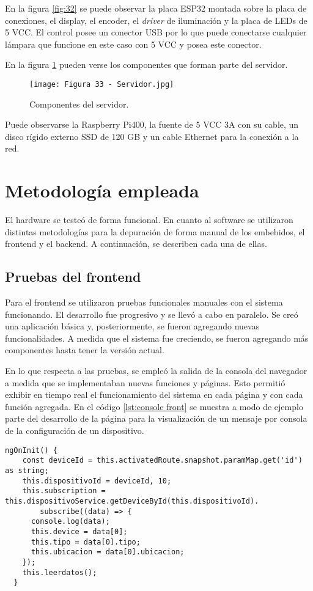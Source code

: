 En la figura  \ref{fig:32} se puede observar la placa ESP32 montada sobre la placa de conexiones, el display, el encoder, el \textit{driver} de iluminación y la placa de LEDs de 5 VCC. El control posee un conector USB por lo que puede conectarse cualquier lámpara que funcione en este caso con 5 VCC y posea este conector.

En la figura \ref{fig:33} pueden verse los componentes que forman parte del servidor.

\begin{figure}[h]
\centering
\texttt{[image: Figura 33 - Servidor.jpg]}
\caption[Servidor]{Componentes del servidor.}
\label{fig:33}
\end{figure}

Puede observarse la Raspberry Pi400, la fuente de 5 VCC 3A con su cable, un disco rígido externo SSD de 120 GB y un cable Ethernet para la conexión a la red.

\section{Metodología empleada}

El hardware se testeó de forma funcional. En cuanto al software se utilizaron distintas metodologías para la depuración de forma manual de los embebidos, el frontend y el backend. A continuación, se describen cada una de ellas.

\subsection{Pruebas del frontend}

Para el frontend se utilizaron pruebas funcionales manuales con el sistema funcionando. El desarrollo fue progresivo y se llevó a cabo en paralelo. Se creó una aplicación básica y, posteriormente, se fueron agregando nuevas funcionalidades. A medida que el sistema fue creciendo, se fueron agregando más componentes hasta tener la versión actual.

En lo que respecta a las pruebas, se empleó la salida de la consola del navegador a medida que se implementaban nuevas funciones y páginas. Esto permitió exhibir en tiempo real el funcionamiento del sistema en cada página y con cada función agregada. En el código \ref{lst:console front} se muestra a modo de ejemplo parte del desarrollo de la página para la visualización de un mensaje por consola de la configuración de un dispositivo.

\begin{lstlisting}[caption={Muestra por consola de los datos recibidos.}, label={lst:console front}]
ngOnInit() {
    const deviceId = this.activatedRoute.snapshot.paramMap.get('id') as string;
    this.dispositivoId = deviceId, 10;
    this.subscription = this.dispositivoService.getDeviceById(this.dispositivoId).
   		subscribe((data) => {
      console.log(data);
      this.device = data[0];
      this.tipo = data[0].tipo;
      this.ubicacion = data[0].ubicacion;
    });
    this.leerdatos();
  }
\end{lstlisting}

